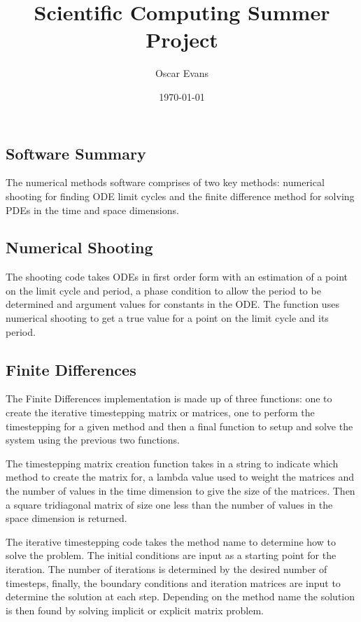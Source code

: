 \documentclass[10pt]{article}
\title{Scientific Computing Summer Project}
\author{Oscar Evans}
\date{\today}
\begin{document}
\maketitle

\begin{multicols}{2}

\section{Software Summary}
The numerical methods software comprises of two key methods: numerical shooting for finding ODE limit cycles and the finite difference method for solving PDEs in the time and space dimensions.

\subsection{Numerical Shooting}
The shooting code takes ODEs in first order form with an estimation of a point on the limit cycle and period, a phase condition to allow the period to be determined and argument values for constants in the ODE. The function uses numerical shooting to get a true value for a point on the limit cycle and its period. 



\subsection{Finite Differences}
The Finite Differences implementation is made up of three functions: one to create the iterative timestepping matrix or matrices, one to perform the timestepping for a given method and then a final function to setup and solve the system using the previous two functions.

The timestepping matrix creation function takes in a string to indicate which method to create the matrix for, a lambda value used to weight the matrices and the number of values in the time dimension to give the size of the matrices. Then a square tridiagonal matrix of size one less than the number of values in the space dimension is returned. 

The iterative timestepping code takes the method name to determine how to solve the problem. The initial conditions are input as a starting point for the iteration. The number of iterations is determined by the desired number of timesteps, finally, the boundary conditions and iteration matrices are input to determine the solution at each step. Depending on the method name the solution is then found by solving implicit or explicit matrix problem. 


\end{multicols}
\end{document}
